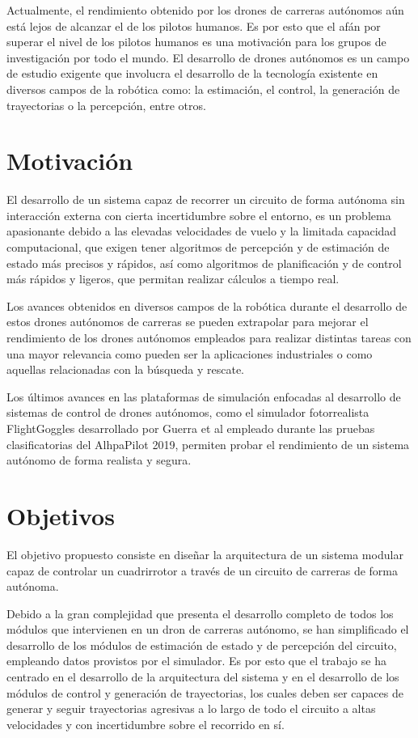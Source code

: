 Actualmente, el rendimiento obtenido por los drones de carreras autónomos aún está lejos de alcanzar el de los pilotos humanos. Es por esto que el afán por superar el nivel de los pilotos humanos es una motivación para los grupos de investigación por todo el mundo. El desarrollo de drones autónomos es un campo de estudio exigente que involucra el desarrollo de la tecnología existente en diversos campos de la robótica como: la estimación, el control, la generación de trayectorias o la percepción, entre otros. 

\section{Motivación}

El desarrollo de un sistema capaz de recorrer un circuito de forma autónoma sin interacción externa con cierta incertidumbre sobre el entorno, es un problema apasionante debido a las elevadas velocidades de vuelo y la limitada capacidad computacional, que exigen tener algoritmos de percepción y de estimación de estado más precisos y rápidos, así como algoritmos de planificación y de control más rápidos y ligeros, que permitan realizar cálculos a tiempo real.

Los avances obtenidos en diversos campos de la robótica durante el desarrollo de estos drones autónomos de carreras se pueden extrapolar para mejorar el rendimiento de los drones autónomos empleados para realizar distintas tareas con una mayor relevancia como pueden ser la aplicaciones industriales o como aquellas relacionadas con la búsqueda y rescate.

Los últimos avances en las plataformas de simulación enfocadas al desarrollo de sistemas de control de drones autónomos, como el simulador fotorrealista FlightGoggles desarrollado por Guerra et al \cite{guerra2019flightgoggles} empleado durante las pruebas clasificatorias del AlhpaPilot 2019, permiten probar el rendimiento de un sistema autónomo de forma realista y segura.



\section{Objetivos}
El objetivo propuesto consiste en diseñar la arquitectura de un sistema modular capaz de controlar un cuadrirrotor a través de un circuito de carreras de forma autónoma.

Debido a la gran complejidad que presenta el desarrollo completo de todos los módulos que intervienen en un dron de carreras autónomo, se han simplificado el desarrollo de los módulos de estimación de estado y de percepción del circuito, empleando datos provistos por el simulador. Es por esto que el trabajo se ha centrado en el desarrollo de la arquitectura del sistema y en el desarrollo de los módulos de control y generación de trayectorias, los cuales deben ser capaces de generar y seguir trayectorias agresivas a lo largo de todo el circuito a altas velocidades y con incertidumbre sobre el recorrido en sí.

